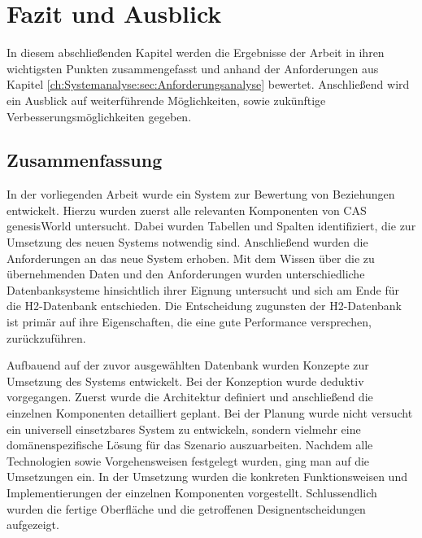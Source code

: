 
\chapter{Fazit und Ausblick}
\label{ch:Ergebnis}

In diesem abschließenden Kapitel werden die Ergebnisse der Arbeit in ihren wichtigsten Punkten zusammengefasst und anhand der Anforderungen aus Kapitel \ref{ch:Systemanalyse:sec:Anforderungsanalyse} bewertet. Anschließend wird ein Ausblick auf weiterführende Möglichkeiten, sowie zukünftige Verbesserungsmöglichkeiten gegeben. 

\section{Zusammenfassung}
\label{ch:Ergebnis:sec:zusammenfassung}

In der vorliegenden Arbeit wurde ein System zur Bewertung von Beziehungen entwickelt. Hierzu wurden zuerst alle relevanten Komponenten von CAS genesisWorld untersucht. Dabei wurden Tabellen und Spalten identifiziert, die zur Umsetzung des neuen Systems notwendig sind. Anschließend wurden die Anforderungen an das neue System erhoben. Mit dem Wissen über die zu übernehmenden Daten und den Anforderungen wurden unterschiedliche  Datenbanksysteme hinsichtlich ihrer Eignung untersucht und sich am Ende für die H2-Datenbank entschieden. Die Entscheidung zugunsten der H2-Datenbank ist primär auf ihre Eigenschaften, die eine gute Performance versprechen, zurückzuführen.   

Aufbauend auf der zuvor ausgewählten Datenbank wurden Konzepte zur Umsetzung des Systems entwickelt. Bei der Konzeption wurde deduktiv vorgegangen. Zuerst wurde die Architektur definiert und anschließend die einzelnen Komponenten detailliert geplant. Bei der Planung wurde nicht versucht ein universell einsetzbares System zu entwickeln, sondern vielmehr eine domänenspezifische Lösung für das Szenario auszuarbeiten. Nachdem alle Technologien sowie Vorgehensweisen festgelegt wurden, ging man auf die Umsetzungen ein. In der Umsetzung wurden die konkreten Funktionsweisen und Implementierungen der einzelnen Komponenten vorgestellt. Schlussendlich wurden die fertige Oberfläche und die getroffenen Designentscheidungen aufgezeigt.
 
